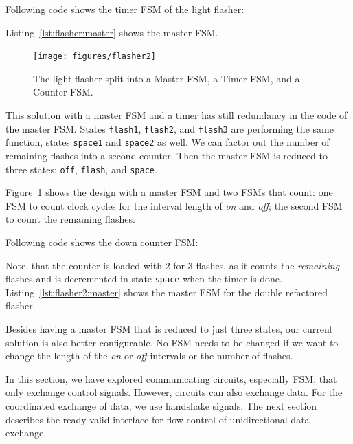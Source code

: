 \documentclass[%
    10pt,
    headinclude, footexclude,
    openright, %
    notitlepage,
    cleardoubleempty,
    headsepline,
    pointlessnumbers,
    bibtotoc, idxtotoc,
    ]{scrbook}
\newcommand{\code}[1]{{\small{\texttt{#1}}}}
\begin{document}
\noindent Following code shows the timer FSM of the light flasher:


\noindent Listing~\ref{lst:flasher:master} shows the master FSM.


\begin{figure}
  \centering
  \texttt{[image: figures/flasher2]}
  \caption{The light flasher split into a Master FSM, a Timer FSM, and a Counter FSM.}
  \label{fig:flasher2}
\end{figure}

This solution with a master FSM and a timer has still redundancy in the code
of the master FSM. States \code{flash1}, \code{flash2}, and \code{flash3}
are performing the same function, states \code{space1} and \code{space2} as well.
We can factor out the number of remaining flashes into a second counter.
Then the master FSM is reduced to three states: \code{off}, \code{flash},
and \code{space}.

Figure~\ref{fig:flasher2} shows the design with a master FSM and two FSMs
that count: one FSM to count clock cycles for the interval length of \emph{on}
and \emph{off}; the second FSM to count the remaining flashes.

Following code shows the down counter FSM:


\noindent Note, that the counter is loaded with 2 for 3 flashes, as it counts the
\emph{remaining} flashes and is decremented in state \code{space} when the timer
is done. Listing~\ref{lst:flasher2:master} shows the master FSM for the double refactored flasher.


Besides having a master FSM that is reduced to just three states, our current solution
is also better configurable. No FSM needs to be changed if we want to change
the length of the \emph{on} or \emph{off} intervals or the number of flashes.

In this section, we have explored communicating circuits, especially FSM, that
only exchange control signals. However, circuits can also exchange data.
For the coordinated exchange of data, we use handshake signals.
The next section describes the ready-valid interface for flow control of
unidirectional data exchange.
\end{document}
